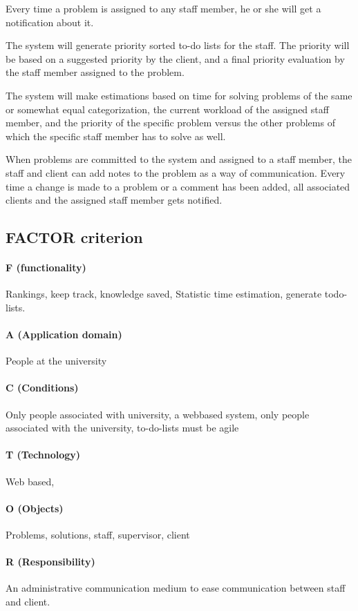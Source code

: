 Every time a problem is assigned to any staff member, he or she will get a notification about it.

The system will generate priority sorted to-do lists for the staff. The priority will be based on a suggested priority by the client, and a final priority evaluation by the staff member assigned to the problem.

The system will make estimations based on time for solving problems of the same or somewhat equal categorization, the current workload of the assigned staff member, and the priority of the specific problem versus the other problems of which the specific staff member has to solve as well. 

When problems are committed to the system and assigned to a staff member, the staff and client can add notes to the problem as a way of communication. Every time a change is made to a problem or a comment has been added, all associated clients and the assigned staff member gets notified.

\subsection{FACTOR criterion}
\label{sec:factor}


\paragraph{F (functionality)} Rankings, keep track, knowledge saved, Statistic time estimation, generate todo-lists.

\paragraph{A (Application domain)} People at the university

\paragraph{C (Conditions)} Only people associated with university, a webbased system, only people associated with the university, to-do-lists must be agile

\paragraph{T (Technology)} Web based, 

\paragraph{O (Objects)} Problems, solutions, staff, supervisor, client

\paragraph{R (Responsibility)} An administrative communication medium to ease communication between staff and client.\\